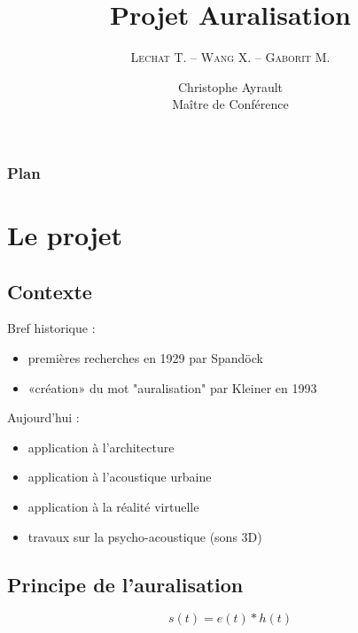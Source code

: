 \documentclass{beamer}
\title[Projet Auralisation]{Projet Auralisation}
\institute{L2 SPI TD2\\Novembre 2012 -- Janvier 2013}
\author{\textsc{Lechat} T. -- \textsc{Wang} X. -- \textsc{Gaborit} M.}
\date{Christophe Ayrault\\Maître de Conférence\\\bigskip\scalebox{2}{\insertlogo}}
\begin{document}
\begin{frame}
\titlepage
\end{frame}

\begin{frame}
\frametitle{Plan}
\tableofcontents
\end{frame}

\section{Le projet}
\subsection{Contexte}

\begin{frame}

Bref historique :
\begin{itemize}
    \item premières recherches en 1929 par Spandöck
    \item «création» du mot "auralisation" par Kleiner en 1993
\end{itemize}

Aujourd'hui :

\begin{itemize}
    \item application à l'architecture
    \item application à l'acoustique urbaine
    \item application à la réalité virtuelle
    \item travaux sur la psycho-acoustique (sons 3D)
\end{itemize}

\end{frame}

\subsection{Principe de l'auralisation}

\begin{frame}

\begin{figure}
\end{figure}

\begin{equation*}
s(t) = e(t)\ast h(t)
\end{equation*}

\end{frame}
\end{document}

